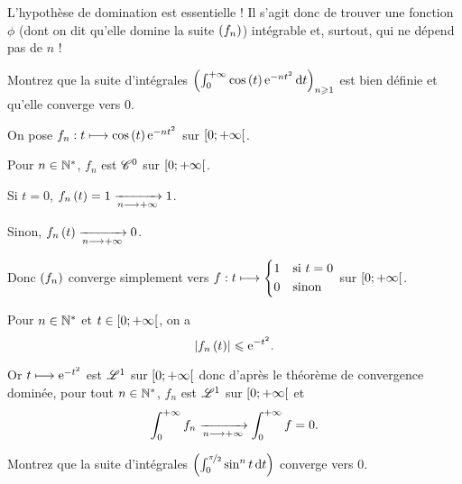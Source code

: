 L'hypothèse de domination est essentielle ! Il s'agit donc de trouver une fonction \(\phi\) (dont on dit qu'elle domine la suite \(\paren{f_n}\)) intégrable et, surtout, qui ne dépend pas de \(n\) !

\begin{exo}
Montrez que la suite d'intégrales \(\paren{\int_0^{\pinf}\cos\paren{t}\e{-nt^2}\odif{t}}_{n\geq1}\) est bien définie et qu'elle converge vers \(0\).
\end{exo}

\begin{corr}
On pose \(f_n:t\mapsto\cos\paren{t}\e{-nt^2}\) sur \(\intervie{0}{\pinf}\).

Pour \(n\in\Ns\), \(f_n\) est \(\classe{0}\) sur \(\intervie{0}{\pinf}\).

Si \(t=0\), \(f_n\paren{t}=1\tendqd{n\to\pinf}1\).

Sinon, \(f_n\paren{t}\tendqd{n\to\pinf}0\).

Donc \(\paren{f_n}\) converge simplement vers \(f:t\mapsto\begin{dcases}
    1 &\text{si }t=0 \\
    0 &\text{sinon}
\end{dcases}\) sur \(\intervie{0}{\pinf}\).

Pour \(n\in\Ns\) et \(t\in\intervie{0}{\pinf}\), on a \[\abs{f_n\paren{t}}\leq\e{-t^2}.\]

Or \(t\mapsto\e{-t^2}\) est \(\integ{1}{}{}\) sur \(\intervie{0}{\pinf}\) donc d'après le théorème de convergence dominée, pour tout \(n\in\Ns\), \(f_n\) est \(\integ{1}{}{}\) sur \(\intervie{0}{\pinf}\) et \[\int_0^{\pinf}f_n\tendqd{n\to\pinf}\int_0^{\pinf}f=0.\]
\end{corr}

\begin{exo}
Montrez que la suite d'intégrales \(\paren{\int_0^{\nicefrac{\pi}{2}}\sin^nt\odif{t}}\) converge vers \(0\).
\end{exo}

